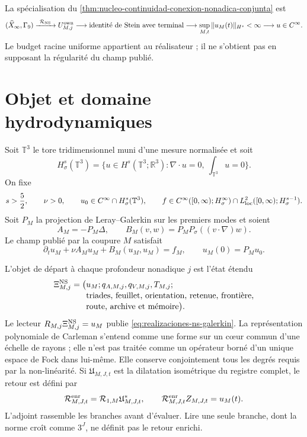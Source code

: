 \noindent La spécialisation du
\cref{thm:nucleo-continuidad-conexion-nonadica-conjunta} est
\[
 (\widehat X_\infty,\Gamma_9)
 \xrightarrow{\ \mathcal R_{\rm NS}\ }
 U^{\rm own}_{M,j}
 \longrightarrow\text{identité de Stein avec terminal}
 \longrightarrow\sup_{M,t}\|u_M(t)\|_{H^s}<\infty
 \longrightarrow u\in C^\infty.
\]
Le budget racine uniforme appartient au réalisateur ; il ne s'obtient pas
en supposant la régularité du champ publié.

\section*{Objet et domaine hydrodynamiques}

Soit \(\mathbb T^3\) le tore tridimensionnel muni d'une mesure normalisée et soit
\[
 H^s_\sigma(\mathbb T^3)
 =\{u\in H^s(\mathbb T^3;\mathbb R^3):
      \nabla\!\cdot u=0,\ \textstyle\int_{\mathbb T^3}u=0\}.
\]
On fixe
\begin{equation}\label{eq:realizaciones-ns-dominio}
 s>\frac52,
 \qquad \nu>0,
 \qquad u_0\in C^\infty\cap H^s_\sigma(\mathbb T^3),
 \qquad
 f\in C^\infty([0,\infty);H^\infty_\sigma)
       \cap L^2_{\rm loc}([0,\infty);H^{s-1}_\sigma).
\end{equation}
Soit \(P_M\) la projection de Leray--Galerkin sur les premiers modes et soient
\[
 A_M=-P_M\Delta,
 \qquad
 B_M(v,w)=P_MP_\sigma((v\!\cdot\!\nabla)w).
\]
Le champ publié par la coupure \(M\) satisfait
\begin{equation}\label{eq:realizaciones-ns-galerkin}
 \partial_tu_M+\nu A_Mu_M+B_M(u_M,u_M)=f_M,
 \qquad u_M(0)=P_Mu_0.
\end{equation}

L'objet de départ à chaque profondeur nonadique \(j\) est l'état
étendu
\begin{equation}\label{eq:realizaciones-ns-estado}
 \begin{aligned}
 \Xi_{M,j}^{\rm NS}
 =\bigl(&u_M;q_{A,M,j},q_{V,M,j},T_{M,j};\\[-1mm]
        &\text{triades, feuillet, orientation, retenue, frontière,}\\[-1mm]
        &\text{route, archive et mémoire}\bigr).
 \end{aligned}
\end{equation}
Le lecteur \(R_{M,j}\Xi_{M,j}^{\rm NS}=u_M\) publie
\eqref{eq:realizaciones-ns-galerkin}. La représentation polynomiale de
Carleman s'entend comme une forme sur un cœur commun d'une échelle de rayons ;
elle n'est pas traitée comme un opérateur borné d'un unique espace de Fock dans lui-même.
Elle conserve conjointement tous les degrés requis par la non-linéarité. Si
\(\mathfrak U_{M,J,t}\) est la dilatation isométrique du registre complet,
le retour est défini par
\begin{equation}\label{eq:realizaciones-ns-retorno-completo}
 \mathcal R_{M,J,t}^{\rm enr}
 =\mathcal R_{1,M}\mathfrak U_{M,J,t}^*,
 \qquad
 \mathcal R_{M,J,t}^{\rm enr}Z_{M,J,t}=u_M(t).
\end{equation}
L'adjoint rassemble les branches avant d'évaluer. Lire une seule branche, dont la norme
croît comme \(3^J\), ne définit pas le retour enrichi.

